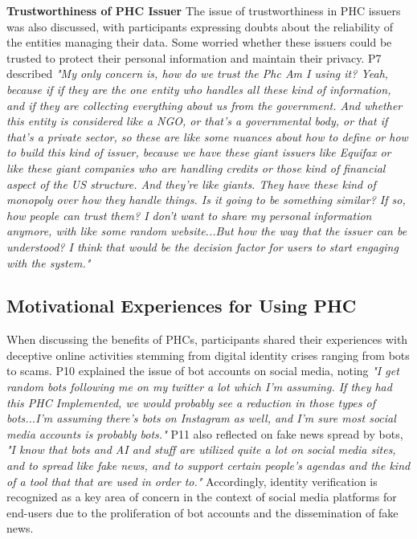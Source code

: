 \textbf{Trustworthiness of PHC Issuer} The issue of trustworthiness in PHC issuers was also discussed, with participants expressing doubts about the reliability of the entities managing their data. Some worried whether these issuers could be trusted to protect their personal information and maintain their privacy. P7 described \textit{"My only concern is, how do we trust the Phc Am I using it? Yeah, because if if they are the one entity who handles all these kind of information, and if they are collecting everything about us from the government. And whether this entity is considered like a NGO, or that's a governmental body, or that if that's a private sector, so these are like some nuances about how to define or how to build this kind of issuer, because we have these giant issuers like Equifax or like these giant companies who are handling credits or those kind of financial aspect of the US structure. And they're like giants. They have these kind of monopoly over how they handle things. Is it going to be something similar? If so, how people can trust them? I don't want to share my personal information anymore, with like some random website...But how the way that the issuer can be understood? I think that would be the decision factor for users to start engaging with the system."}

\subsection{Motivational Experiences for Using PHC}
When discussing the benefits of PHCs, participants shared their experiences with deceptive online activities stemming from digital identity crises ranging from bots to scams. P10 explained the issue of bot accounts on social media, noting \textit{"I get random bots following me on my twitter a lot which I'm assuming. If they had this PHC Implemented, we would probably see a reduction in those types of bots...I'm assuming there's bots on Instagram as well, and I'm sure most social media accounts is probably bots."} P11 also reflected on fake news spread by bots, \textit{"I know that bots and AI and stuff are utilized quite a lot on social media sites, and to spread like fake news, and to support certain people's agendas and the kind of a tool that that are used in order to."} Accordingly, identity verification is recognized as a key area of concern in the context of social media platforms for end-users due to the proliferation of bot accounts and the dissemination of fake news. 

